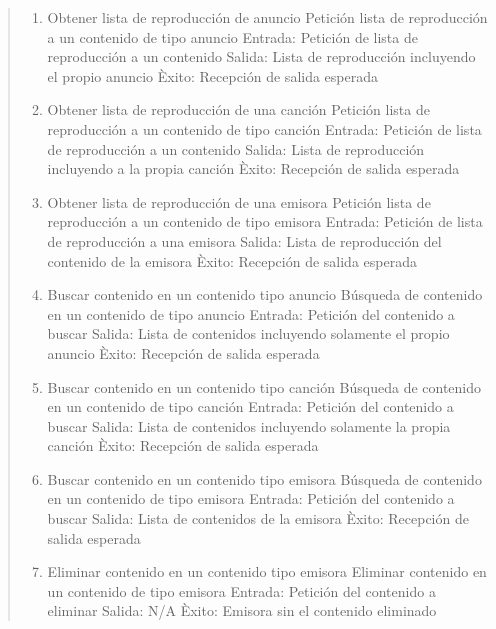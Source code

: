 \documentclass[DIV=calc,paper=a4,fontsize=11pt,onecolumn]{scrartcl}	 %
\newcommand{\hint}[1]{\begin{quote}\itshape #1 \end{quote}}
\begin{document}
	\hint{
		\begin{enumerate}
			\item Obtener lista de reproducción de anuncio
			\subitem Petición lista de reproducción a un contenido de tipo anuncio
			\subitem Entrada: Petición de lista de reproducción a un contenido
			\subitem Salida: Lista de reproducción incluyendo el propio anuncio
			\subitem Èxito: Recepción de salida esperada
			
			\item Obtener lista de reproducción de una canción
			\subitem Petición lista de reproducción a un contenido de tipo canción
			\subitem Entrada: Petición de lista de reproducción a un contenido
			\subitem Salida: Lista de reproducción incluyendo a la propia canción
			\subitem Èxito: Recepción de salida esperada			
			
			\item Obtener lista de reproducción de una emisora
			\subitem Petición lista de reproducción a un contenido de tipo emisora
			\subitem Entrada: Petición de lista de reproducción a una emisora
			\subitem Salida: Lista de reproducción del contenido de la emisora
			\subitem Èxito: Recepción de salida esperada		
			
			\item Buscar contenido en un contenido tipo anuncio
			\subitem Búsqueda de contenido en un contenido de tipo anuncio
			\subitem Entrada: Petición del contenido a buscar
			\subitem Salida: Lista de contenidos incluyendo solamente el propio anuncio
			\subitem Èxito: Recepción de salida esperada							
			
			\item Buscar contenido en un contenido tipo canción
			\subitem Búsqueda de contenido en un contenido de tipo canción
			\subitem Entrada: Petición del contenido a buscar
			\subitem Salida: Lista de contenidos incluyendo solamente la propia canción
			\subitem Èxito: Recepción de salida esperada			
			
			\item Buscar contenido en un contenido tipo emisora
			\subitem Búsqueda de contenido en un contenido de tipo emisora
			\subitem Entrada: Petición del contenido a buscar
			\subitem Salida: Lista de contenidos de la emisora
			\subitem Èxito: Recepción de salida esperada				
			
			\item Eliminar contenido en un contenido tipo emisora
			\subitem Eliminar contenido en un contenido de tipo emisora
			\subitem Entrada: Petición del contenido a eliminar
			\subitem Salida: N/A
			\subitem Èxito: Emisora sin el contenido eliminado					
        \end{enumerate}			
	}			
\end{document}
